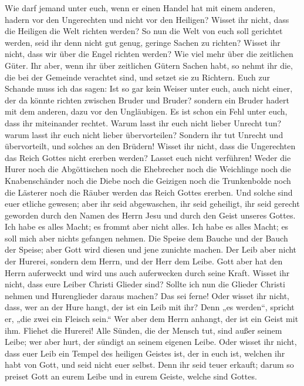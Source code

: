  Wie darf jemand unter euch, wenn er einen Handel hat mit
einem anderen, hadern vor den Ungerechten und nicht vor den Heiligen?
 Wisset ihr nicht, dass die Heiligen die Welt richten
werden? So nun die Welt von euch soll gerichtet werden, seid ihr denn
nicht gut genug, geringe Sachen zu richten?  Wisset ihr
nicht, dass wir über die Engel richten werden? Wie viel mehr über die
zeitlichen Güter.  Ihr aber, wenn ihr über zeitlichen
Gütern Sachen habt, so nehmt ihr die, die bei der Gemeinde verachtet
sind, und setzet sie zu Richtern.  Euch zur Schande muss
ich das sagen: Ist so gar kein Weiser unter euch, auch nicht einer, der
da könnte richten zwischen Bruder und Bruder?  sondern ein
Bruder hadert mit dem anderen, dazu vor den Ungläubigen. 
Es ist schon ein Fehl unter euch, dass ihr miteinander rechtet. Warum
lasst ihr euch nicht lieber Unrecht tun? warum lasst ihr euch nicht
lieber übervorteilen?  Sondern ihr tut Unrecht und
übervorteilt, und solches an den Brüdern!  Wisset ihr
nicht, dass die Ungerechten das Reich Gottes nicht ererben werden?
Lasset euch nicht verführen! Weder die Hurer noch die Abgöttischen noch
die Ehebrecher noch die Weichlinge noch die Knabenschänder
 noch die Diebe noch die Geizigen noch die Trunkenbolde
noch die Lästerer noch die Räuber werden das Reich Gottes ererben.
 Und solche sind euer etliche gewesen; aber ihr seid
abgewaschen, ihr seid geheiligt, ihr seid gerecht geworden durch den
Namen des Herrn Jesu und durch den Geist unseres Gottes. 
Ich habe es alles Macht; es frommt aber nicht alles. Ich habe es alles
Macht; es soll mich aber nichts gefangen nehmen.  Die
Speise dem Bauche und der Bauch der Speise; aber Gott wird diesen und
jene zunichte machen. Der Leib aber nicht der Hurerei, sondern dem
Herrn, und der Herr dem Leibe.  Gott aber hat den Herrn
auferweckt und wird uns auch auferwecken durch seine Kraft.
 Wisset ihr nicht, dass eure Leiber Christi Glieder sind?
Sollte ich nun die Glieder Christi nehmen und Hurenglieder daraus
machen? Das sei ferne!  Oder wisset ihr nicht, dass, wer
an der Hure hangt, der ist ein Leib mit ihr? Denn „es werden``, spricht
er, „die zwei ein Fleisch sein.``  Wer aber dem Herrn
anhangt, der ist ein Geist mit ihm.  Fliehet die Hurerei!
Alle Sünden, die der Mensch tut, sind außer seinem Leibe; wer aber hurt,
der sündigt an seinem eigenen Leibe.  Oder wisset ihr
nicht, dass euer Leib ein Tempel des heiligen Geistes ist, der in euch
ist, welchen ihr habt von Gott, und seid nicht euer selbst.
 Denn ihr seid teuer erkauft; darum so preiset Gott an
eurem Leibe und in eurem Geiste, welche sind Gottes.

